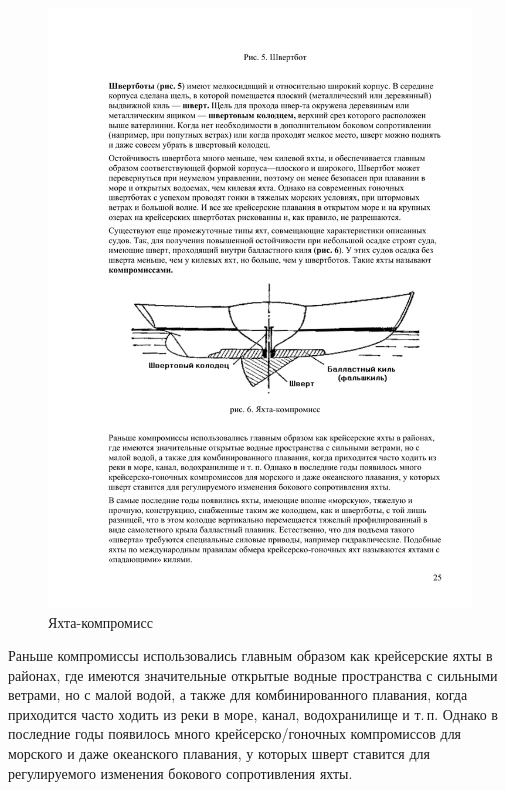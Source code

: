 \documentclass[a4paper, 12pt, twoside, final]{scrbook}
\begin{document}
\begin{figure}[htbp]
\centering
\includegraphics{Kompromiss}
\protect\caption{\label{fig:6}Яхта-компромисс}
\end{figure}


Раньше компромиссы использовались главным образом как крейсерские
яхты в районах, где имеются значительные открытые водные пространства
с сильными ветрами, но с малой водой, а также для комбинированного
плавания, когда приходится часто ходить из реки в море, канал, водохранилище
и т.\,п. Однако в последние годы появилось много крейсерско\-/гоночных
компромиссов для морского и даже океанского плавания, у которых шверт
ставится для регулируемого изменения бокового сопротивления яхты.
\end{document}
